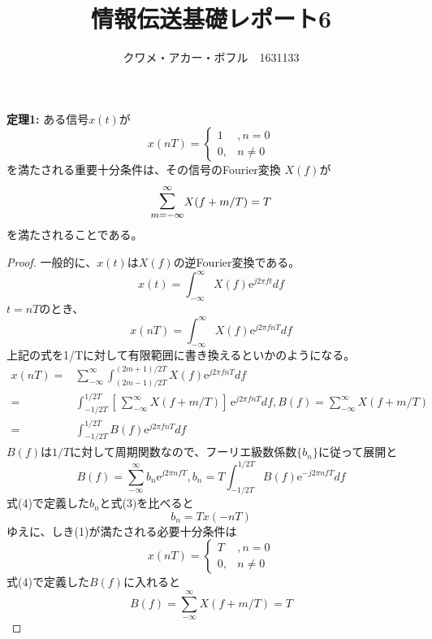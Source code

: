 \documentclass[24 pts]{article}
\title{情報伝送基礎レポート6}
\date{}
\author{クワメ・アカー・ボフル　1631133}
\newcommand{\me}{\mathrm{e}}
\begin{document}
\maketitle
\newpage
\textbf{定理1:}
ある信号$x(t)$が 
\[
x(nT)=
\begin{cases}
1&,n=0\\
0,&n\neq0
 \end{cases}
\]
を満たされる重要十分条件は、その信号のFourier変換
 $X(f)$が \begin{equation}\mathlarger{\mathlarger{\sum}}_{m=-\infty}^\infty X(f+m/T)=T\end{equation}を満たされることである。
\begin{proof}
一般的に、$x(t)$は$X(f)$の逆Fourier変換である。
$$x(t)=\int_{-\infty}^{\infty} X(f)\me^{j2\pi ft} df$$
$t=nT$のとき、
\begin{equation}x(nT)=\int_{-\infty}^{\infty} X(f)\me^{j2\pi fnT} df\end{equation}
上記の式を1/Tに対して有限範囲に書き換えるといかのようになる。
\begin{equation}
\begin{split}
x(nT)=&\sum_{-\infty}^{\infty} \int_{(2m-1)/2T}^{(2m+1)/2T}  X(f)\me^{j2\pi fnT} df\\
= &\int_{-1/2T}^{1/2T} \left [\, \sum_{-\infty}^{\infty} X(f+m/T)\right]\, \me^{j2\pi fnT} df, B(f)= \sum_{-\infty}^{\infty} X(f+m/T)\\
 =&\int_{-1/2T}^{1/2T} B(f)\me^{j2\pi fnT} df
\end{split}
\end{equation}
$B(f)$は$1/T$に対して周期関数なので、フーリエ級数係数$\{ b_n\}$に従って展開と
\begin{equation} B(f) =\sum_{-\infty}^{\infty} b_n\me^{j2\pi nfT}
, b_n =T\int_{-1/2T}^{1/2T} B(f)  \me^{-j2\pi nfT}df \end{equation}
式(4)で定義した$b_n$と式(3)を比べると
$$ b_n=Tx(-nT)$$
ゆえに、しき(1)が満たされる必要十分条件は
\[
x(nT)=
\begin{cases}
T&,n=0\\
0,&n\neq0
 \end{cases}
\]
式(4)で定義した$B(f)$に入れると
$$ B(f)= \sum_{-\infty}^{\infty} X(f+m/T)=T$$
\end{proof}
\end{document}
